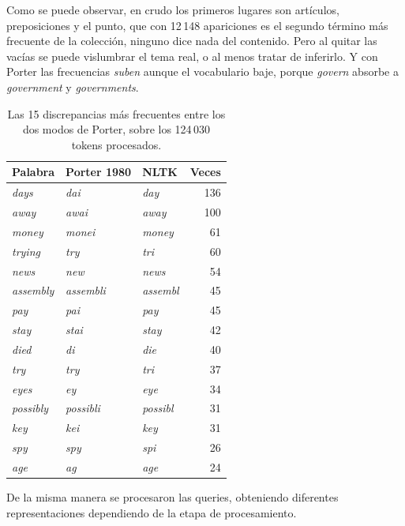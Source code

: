 \documentclass[11pt,letterpaper]{article}
\begin{document}
Como se puede observar, en crudo los primeros lugares son artículos, 
preposiciones y el punto,
que con 12\,148 apariciones es el segundo término más frecuente de
la colección, ninguno dice nada del contenido. Pero al quitar las vacías
se puede vislumbrar el tema real, o al menos tratar de inferirlo. Y con Porter
las frecuencias \emph{suben} aunque el vocabulario baje, porque
\emph{govern} absorbe a \emph{government} y \emph{governments}.

\begin{table}[H]
  \centering
  \footnotesize
  \begin{tabular}{lllr}
    \toprule
    \textbf{Palabra} & \textbf{Porter 1980} & \textbf{NLTK} &
      \textbf{Veces} \\
    \midrule
    \emph{days} & \emph{dai} & \emph{day} & 136 \\
    \emph{away} & \emph{awai} & \emph{away} & 100 \\
    \emph{money} & \emph{monei} & \emph{money} & 61 \\
    \emph{trying} & \emph{try} & \emph{tri} & 60 \\
    \emph{news} & \emph{new} & \emph{news} & 54 \\
    \emph{assembly} & \emph{assembli} & \emph{assembl} & 45 \\
    \emph{pay} & \emph{pai} & \emph{pay} & 45 \\
    \emph{stay} & \emph{stai} & \emph{stay} & 42 \\
    \emph{died} & \emph{di} & \emph{die} & 40 \\
    \emph{try} & \emph{try} & \emph{tri} & 37 \\
    \emph{eyes} & \emph{ey} & \emph{eye} & 34 \\
    \emph{possibly} & \emph{possibli} & \emph{possibl} & 31 \\
    \emph{key} & \emph{kei} & \emph{key} & 31 \\
    \emph{spy} & \emph{spy} & \emph{spi} & 26 \\
    \emph{age} & \emph{ag} & \emph{age} & 24 \\
    \bottomrule
  \end{tabular}
  \caption{Las 15 discrepancias más frecuentes entre los dos modos de
    Porter, sobre los 124\,030 tokens procesados.}
  \label{tab:porter}
\end{table}

De la misma manera se procesaron las queries, obteniendo diferentes
representaciones dependiendo de la etapa de procesamiento.
\end{document}

